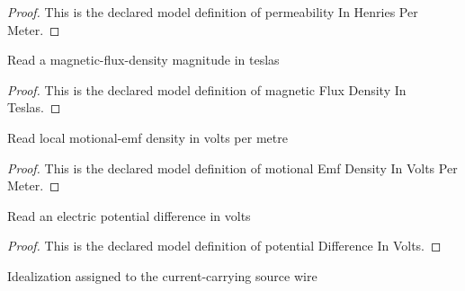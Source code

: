 \begin{proof}
  This is the declared model definition of permeability In Henries Per Meter.
\end{proof}
\begin{definition}
  \label{def:physics:phyx-mini-0883:phyxminiproblems-problemphyxmini0883-magneticfluxdensityinteslas}
  Read a magnetic-flux-density magnitude in teslas
\end{definition}
\begin{proof}
  This is the declared model definition of magnetic Flux Density In Teslas.
\end{proof}
\begin{definition}
  \label{def:physics:phyx-mini-0883:phyxminiproblems-problemphyxmini0883-motionalemfdensityinvoltspermeter}
  Read local motional-emf density in volts per metre
\end{definition}
\begin{proof}
  This is the declared model definition of motional Emf Density In Volts Per Meter.
\end{proof}
\begin{definition}
  \label{def:physics:phyx-mini-0883:phyxminiproblems-problemphyxmini0883-potentialdifferenceinvolts}
  Read an electric potential difference in volts
\end{definition}
\begin{proof}
  This is the declared model definition of potential Difference In Volts.
\end{proof}
\begin{definition}
  \label{def:physics:phyx-mini-0883:phyxminiproblems-problemphyxmini0883-sourcewiremodel}
  Idealization assigned to the current-carrying source wire
\end{definition}
